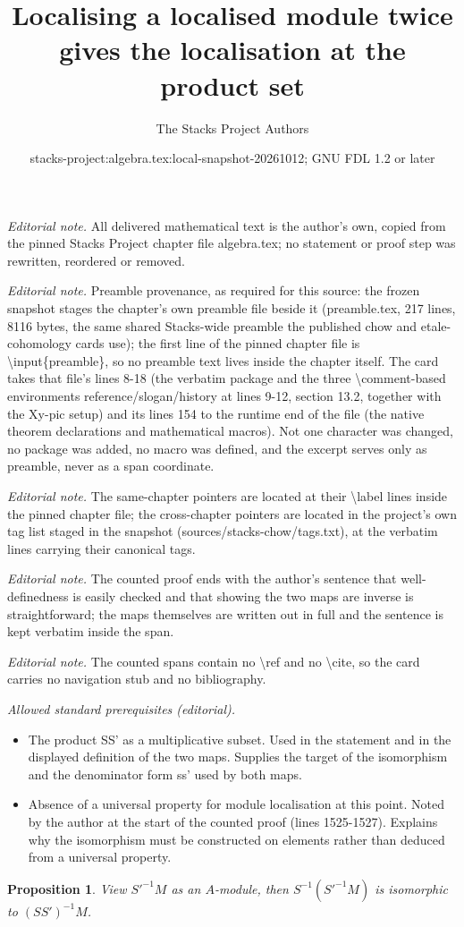 \documentclass[10pt,a4paper]{amsart}
\title{Localising a localised module twice gives the localisation at the product set}
\author{The Stacks Project Authors}
\date{stacks-project:algebra.tex:local-snapshot-20261012; GNU FDL 1.2 or later}
\theoremstyle{plain}
\newtheorem{proposition}[subsection]{Proposition}
\theoremstyle{definition}
\theoremstyle{remark}
\numberwithin{equation}{subsection}
\begin{document}
\maketitle
\noindent\textit{Editorial note.} All delivered mathematical text is the author's own, copied from the pinned Stacks Project chapter file algebra.tex; no statement or proof step was rewritten, reordered or removed.\par\medskip
\noindent\textit{Editorial note.} Preamble provenance, as required for this source: the frozen snapshot stages the chapter's own preamble file beside it (preamble.tex, 217 lines, 8116 bytes, the same shared Stacks-wide preamble the published chow and etale-cohomology cards use); the first line of the pinned chapter file is \textbackslash{}input\{preamble\}, so no preamble text lives inside the chapter itself. The card takes that file's lines 8-18 (the verbatim package and the three \textbackslash{}comment-based environments reference/slogan/history at lines 9-12, section 13.2, together with the Xy-pic setup) and its lines 154 to the runtime end of the file (the native theorem declarations and mathematical macros). Not one character was changed, no package was added, no macro was defined, and the excerpt serves only as preamble, never as a span coordinate.\par\medskip
\noindent\textit{Editorial note.} The same-chapter pointers are located at their \textbackslash{}label lines inside the pinned chapter file; the cross-chapter pointers are located in the project's own tag list staged in the snapshot (sources/stacks-chow/tags.txt), at the verbatim lines carrying their canonical tags.\par\medskip
\noindent\textit{Editorial note.} The counted proof ends with the author's sentence that well-definedness is easily checked and that showing the two maps are inverse is straightforward; the maps themselves are written out in full and the sentence is kept verbatim inside the span.\par\medskip
\noindent\textit{Editorial note.} The counted spans contain no \textbackslash{}ref and no \textbackslash{}cite, so the card carries no navigation stub and no bibliography.\par\medskip
\noindent\textit{Allowed standard prerequisites (editorial).}\begin{itemize}
\item The product SS' as a multiplicative subset. Used in the statement and in the displayed definition of the two maps. Supplies the target of the isomorphism and the denominator form ss' used by both maps.
\item Absence of a universal property for module localisation at this point. Noted by the author at the start of the counted proof (lines 1525-1527). Explains why the isomorphism must be constructed on elements rather than deduced from a universal property.
\end{itemize}\medskip
\begin{proposition}
\label{proposition-localize-twice-module}
View $S'^{-1}M$ as an $A$-module, then $S^{-1}(S'^{-1}M)$ is
isomorphic to $(SS')^{-1}M$.
\end{proposition}
\end{document}
